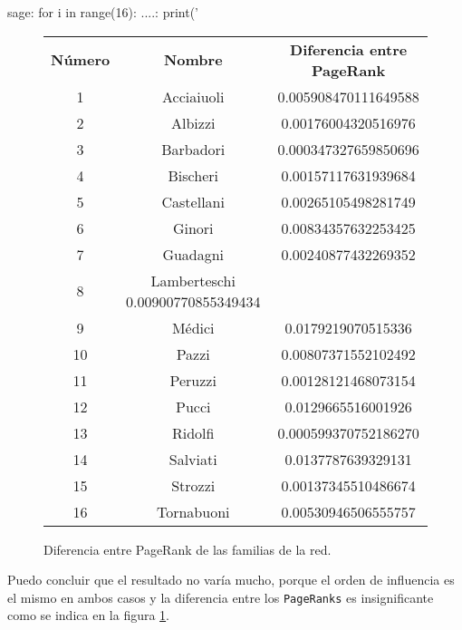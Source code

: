 \begin{sagecommandline}
    sage: for i in range(16):
    ....:   print('%
\end{sagecommandline}
\begin{figure}[H]
    \centering
    \begin{tabular}{|c|c|c|}
        \hline
        \rowcolor{azul} \multicolumn{2}{|c|}{\textbf{Familia}}& \\ \hline
        \rowcolor{azul} \textbf{Número} & \textbf{Nombre} & \textbf{Diferencia entre PageRank} \\ \hline
        1 & Acciaiuoli & 0.005908470111649588 \\ \hline
        2 & Albizzi & 0.00176004320516976 \\ \hline
        3 & Barbadori & 0.000347327659850696 \\ \hline
        4 & Bischeri & 0.00157117631939684 \\ \hline
        5 & Castellani & 0.00265105498281749 \\ \hline
        6 & Ginori & 0.00834357632253425 \\ \hline
        7 & Guadagni & 0.00240877432269352 \\ \hline
        8 & Lamberteschi 0.00900770855349434 \\ \hline
        9 & Médici & 0.0179219070515336 \\ \hline
        10 & Pazzi & 0.00807371552102492 \\ \hline
        11 & Peruzzi & 0.00128121468073154 \\ \hline
        12 & Pucci & 0.0129665516001926 \\ \hline
        13 & Ridolfi & 0.000599370752186270 \\ \hline
        14 & Salviati & 0.0137787639329131 \\ \hline
        15 & Strozzi & 0.00137345510486674 \\ \hline
        16 & Tornabuoni & 0.00530946506555757 \\ \hline
    \end{tabular}
    \caption{Diferencia entre PageRank de las familias de la red.}
    \label{fig:pageRankFamiliasDiferencia}
\end{figure}

\par Puedo concluir que el resultado no varía mucho, porque el orden de influencia es el mismo en ambos casos y la diferencia entre los \texttt{PageRanks} 
es insignificante como se indica en la figura \ref{fig:pageRankFamiliasDiferencia}.

